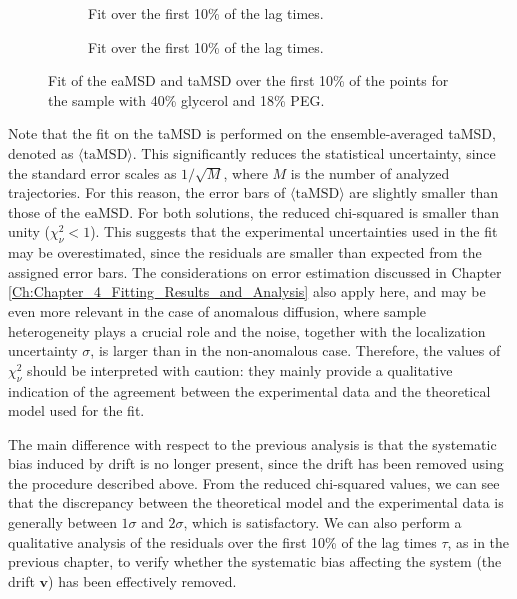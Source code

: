 \begin{figure}[!htbp]
    \centering
    \begin{subfigure}[t]{0.48\textwidth}
        \centering
        
        \caption{Fit over the first 10\% of the lag times.}
    \end{subfigure}
    \hfill
    \begin{subfigure}[t]{0.48\textwidth}
        \centering
        
        \caption{Fit over the first 10\% of the lag times.}
    \end{subfigure}

    \caption{Fit of the eaMSD and taMSD over the first 10\% of the points for the sample with 40\% glycerol and 18\% PEG.}
    \label{fig:anomalous_fit_taMSD_eaMSD_PEG_15_plots}
\end{figure}
\FloatBarrier

Note that the fit on the taMSD is performed on the ensemble-averaged taMSD, denoted as $\langle \mathrm{taMSD} \rangle$. This significantly reduces the statistical uncertainty, since the standard error scales as $1/\sqrt{M}$, where $M$ is the number of analyzed trajectories. For this reason, the error bars of $\langle \mathrm{taMSD} \rangle$ are slightly smaller than those of the $\mathrm{eaMSD}$. For both solutions, the reduced chi-squared is smaller than unity ($\chi_{\nu}^2 < 1$). This suggests that the experimental uncertainties used in the fit may be overestimated, since the residuals are smaller than expected from the assigned error bars. The considerations on error estimation discussed in Chapter \ref{Ch:Chapter_4_Fitting_Results_and_Analysis} also apply here, and may be even more relevant in the case of anomalous diffusion, where sample heterogeneity plays a crucial role and the noise, together with the localization uncertainty $\sigma$, is larger than in the non-anomalous case. Therefore, the values of $\chi_{\nu}^2$ should be interpreted with caution: they mainly provide a qualitative indication of the agreement between the experimental data and the theoretical model used for the fit.

The main difference with respect to the previous analysis is that the systematic bias induced by drift is no longer present, since the drift has been removed using the procedure described above. From the reduced chi-squared values, we can see that the discrepancy between the theoretical model and the experimental data is generally between $1\sigma$ and $2\sigma$, which is satisfactory.
We can also perform a qualitative analysis of the residuals over the first 10\% of the lag times $\tau$, as in the previous chapter, to verify whether the systematic bias affecting the system (the drift $\mathbf{v}$) has been effectively removed.

